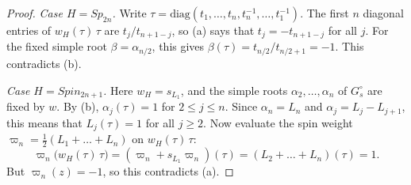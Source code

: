 \documentclass[psamsfonts]{amsart}
\theoremstyle{definition}
\theoremstyle{remark}
\numberwithin{equation}{section}
\newcommand{\diag}{\text{diag}}
\numberwithin{equation}{section}
\theoremstyle{plain}
\begin{document}
\begin{proof}
\emph{Case $H=Sp_{2n}$.} Write $\tau=\diag(t_1,\dots,t_n,t_n^{-1},\dots,t_1^{-1})$. The first $n$ diagonal entries of $w_H(\tau)\,\tau$ are $t_j/t_{n+1-j}$, so (a) says that $t_j=-t_{n+1-j}$ for all $j$. For the fixed simple root $\beta=\alpha_{n/2}$, this gives $\beta(\tau)=t_{n/2}/t_{n/2+1}=-1$. This contradicts (b).

\emph{Case $H=Spin_{2n+1}$.} Here $w_H=s_{L_1}$, and the simple roots $\alpha_2,\dots,\alpha_n$ of $G_s^{\circ}$ are fixed by $w$. By (b), $\alpha_j(\tau)=1$ for $2\leq j\leq n$. Since $\alpha_n=L_n$ and $\alpha_j=L_j-L_{j+1}$, this means that $L_j(\tau)=1$ for all $j\geq2$. Now evaluate the spin weight $\varpi_n=\frac12(L_1+\dots+L_n)$ on $w_H(\tau)\,\tau$:
\[
\varpi_n\big(w_H(\tau)\,\tau\big)=(\varpi_n+s_{L_1}\varpi_n)(\tau)=(L_2+\dots+L_n)(\tau)=1.
\]
But $\varpi_n(z)=-1$, so this contradicts (a).
\end{proof}




\end{document}
